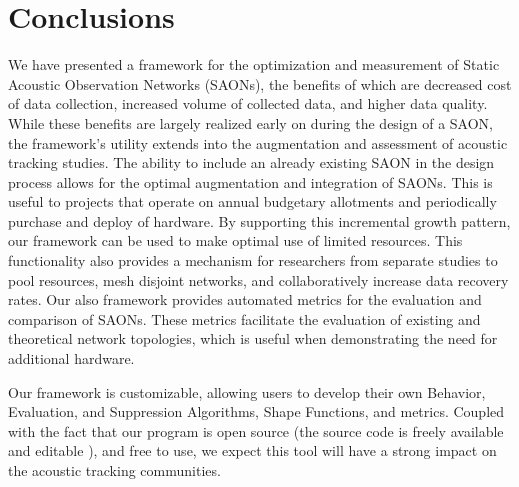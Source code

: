 \chapter{Conclusions}
We have presented a framework for the optimization and measurement of Static Acoustic Observation Networks (SAONs), the benefits of which are decreased cost of data collection, increased volume of collected data, and higher data quality.  While these benefits are largely realized early on during the design of a SAON, the framework's utility extends into the augmentation and assessment of acoustic tracking studies.  The ability to include an already existing SAON in the design process allows for the optimal augmentation and integration of SAONs.  This is useful to projects that operate on annual budgetary allotments and periodically purchase and deploy of hardware.  By supporting this incremental growth pattern, our framework can be used to make optimal use of limited resources.  This functionality also provides a mechanism for researchers from separate studies to pool resources, mesh disjoint networks, and collaboratively increase data recovery rates.  Our also framework provides automated metrics for the evaluation and comparison of SAONs.  These metrics facilitate the evaluation of existing and theoretical network topologies, which is useful when demonstrating the need for additional hardware.

Our framework is customizable, allowing users to develop their own Behavior, Evaluation, and Suppression Algorithms, Shape Functions, and metrics.  Coupled with the fact that our program is open source (the source code is freely available and editable \cite{acousitcdeploy}), and free to use, we expect this tool will have a strong impact on the acoustic tracking communities.  